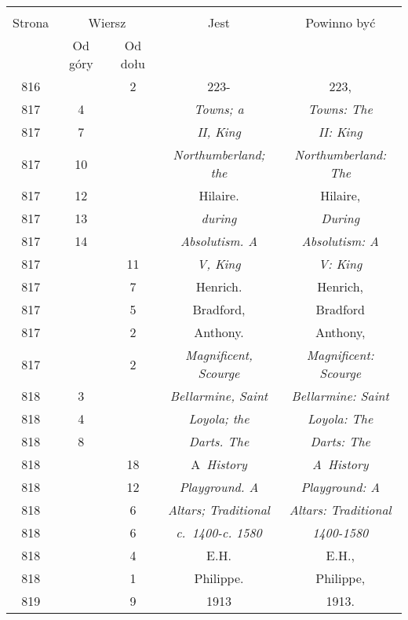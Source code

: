 \documentclass[a4paper,11pt]{article}
\begin{document}
\begin{center}
  \begin{tabular}{|c|c|c|c|c|}
    \hline
    & \multicolumn{2}{c|}{} & & \\
    Strona & \multicolumn{2}{c|}{Wiersz} & Jest
                              & Powinno być \\ \cline{2-3}
    & Od góry & Od dołu & & \\
    \hline
    816 & &  2 & 223- & 223, \\
    817 &  4 & & \emph{Towns; a} & \emph{Towns: The} \\
    817 &  7 & & \emph{II, King} & \emph{II: King} \\
    817 & 10 & & \emph{Northumberland; the} & \emph{Northumberland: The} \\
    817 & 12 & & Hilaire. & Hilaire, \\
    817 & 13 & & \emph{during} & \emph{During} \\
    817 & 14 & & \emph{Absolutism. A} & \emph{Absolutism: A} \\
    817 & & 11 & \emph{V, King} & \emph{V: King} \\
    817 & &  7 & Henrich. & Henrich, \\
    817 & &  5 & Bradford, & Bradford \\
    817 & &  2 & Anthony. & Anthony, \\
    817 & &  2 & \emph{Magnificent, Scourge}
           & \emph{Magnificent: Scourge} \\
    818 &  3 & & \emph{Bellarmine, Saint} & \emph{Bellarmine: Saint} \\
    818 &  4 & & \emph{Loyola; the} & \emph{Loyola: The} \\
    818 &  8 & & \emph{Darts. The} & \emph{Darts: The} \\
    818 & & 18 & A~\emph{History} & \emph{A~History} \\
    818 & & 12 & \emph{Playground. A} & \emph{Playground: A} \\
    818 & &  6 & \emph{Altars; Traditional} & \emph{Altars: Traditional} \\
    818 & &  6 & \emph{c.~1400-c. 1580} & \emph{1400-1580} \\
    818 & &  4 & E.H. & E.H., \\
    818 & &  1 & Philippe. & Philippe, \\
    819 & &  9 & 1913 & 1913. \\

\end{tabular}
\end{center}
\end{document}
